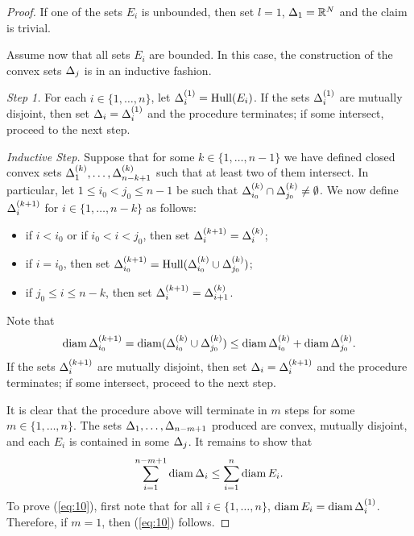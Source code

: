 \documentclass{amsart}
\DeclareMathOperator{\Hull}{Hull}
\begin{document}
\begin{proof}
If one of the sets $E_i$ is unbounded, then set $l=1$, $\Delta_1=\mathbb{R}^N$ and the claim is trivial.

Assume now that all sets $E_i$ are bounded. In this case, the construction of the convex sets $\Delta_j$ is in an inductive fashion.

\emph{Step 1.} For each $i\in\{1,\dots,n\}$, let $\D_i^{(1)} = \Hull(E_i)$. If the sets $\Delta_i^{(1)}$ are mutually disjoint, then set $\Delta_i = \Delta_i^{(1)}$ and the procedure terminates; if some intersect, proceed to the next step.

\emph{Inductive Step.}
Suppose that for some $k\in\{1,\dots,n-1\}$ we have defined closed convex sets $\Delta_1^{(k)},\dots,\Delta_{n-k+1}^{(k)}$ such that at least two of them intersect. In particular, let $1 \leq i_0 < j_0 \leq n-1$ be such that $\Delta_{i_0}^{(k)} \cap \Delta_{j_0}^{(k)} \neq \emptyset$.
 We now define $\Delta^{(k+1)}_i$ for $i\in \{1,\dots,n-k\}$ as follows:
\begin{itemize}
\item if $i < i_0$ or if $i_0<i<j_0$, then set $\Delta^{(k+1)}_i = \Delta^{(k)}_i$;
\item if $i=i_0$, then set $\D^{(k+1)}_{i_0}  = \Hull(\D^{(k)}_{i_0} \cup \D^{(k)}_{j_0})$;
\item if $j_0 \leq i \leq n-k$, then set $\Delta^{(k+1)}_i = \Delta^{(k)}_{i+1}$.
\end{itemize}
Note that
\[ \operatorname{diam}{\Delta^{(k+1)}_{i_0}} = \operatorname{diam}(\Delta^{(k)}_{i_0} \cup \Delta^{(k)}_{j_0}) \leq \operatorname{diam}{\Delta^{(k)}_{i_0}} + \operatorname{diam}{\Delta^{(k)}_{j_0}}.\]
If the sets $\Delta_i^{(k+1)}$ are mutually disjoint, then set $\Delta_i = \Delta_i^{(k+1)}$ and the procedure terminates; if some intersect, proceed to the next step.

It is clear that the procedure above will terminate in $m$ steps for some $m\in\{1,\dots,n\}$. The sets $\Delta_1,\dots,\Delta_{n-m+1}$ produced are convex, mutually disjoint, and each $E_i$ is contained in some $\Delta_j$. It remains to show that
\begin{equation}\label{eq:10}
\sum_{i=1}^{n-m+1} \operatorname{diam}{\Delta_i} \leq \sum_{i=1}^n\operatorname{diam}{E_i}.
\end{equation}
To prove (\ref{eq:10}), first note that for all $i\in\{1,\dots,n\}$, $\operatorname{diam}{E_i} = \operatorname{diam}{\Delta_i^{(1)}}$. Therefore, if $m=1$, then (\ref{eq:10}) follows. 


\end{proof}
\end{document}
